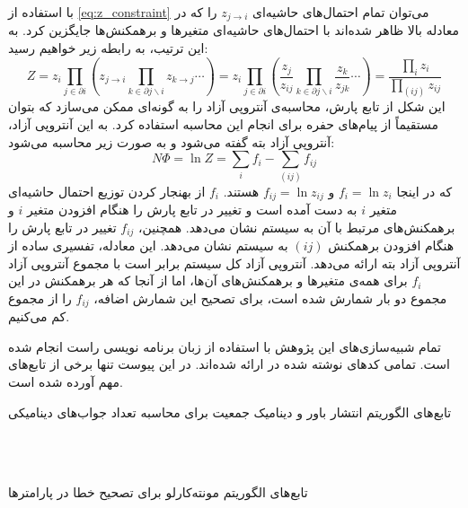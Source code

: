 \begin{appendices}
    با استفاده از
    \autoref{eq:z_constraint}
    می‌توان تمام احتمال‌های حاشیه‌ای
    \( z_{j \to i} \)
    را که در معادله بالا ظاهر شده‌اند با احتمال‌های حاشیه‌ای متغیرها و برهمکنش‌ها جایگزین کرد.
    به این ترتیب، به رابطه زیر خواهیم رسید:
    \[ Z = z_{i} \prod_{j \in \partial i} \left( z_{j \to i} \prod_{k \in \partial j \backslash i} z_{k \to j} \cdots \right) = z_{i} \prod_{j \in \partial i} \left( \frac{z_{j}}{z_{ij}} \prod_{k \in \partial j \backslash i} \frac{z_{k}}{z_{jk}} \cdots \right) = \frac{\prod_{i} z_{i}}{\prod_{(ij)} z_{ij}} \]
    این شکل از تابع پارش، محاسبه‌ی آنتروپی آزاد را به گونه‌ای ممکن می‌سازد که بتوان مستقیماً از پیام‌های حفره برای انجام این محاسبه استفاده کرد.
    به این آنتروپی آزاد، آنتروپی آزاد بته گفته می‌شود و به صورت زیر محاسبه می‌شود:
    \begin{equation}
        N \Phi = \ln Z = \sum_{i} f_{i} - \sum_{(ij)} f_{ij}
    \end{equation}
    که در اینجا
    \( f_{i} = \ln z_{i} \) و \( f_{ij} = \ln z_{ij} \)
    هستند.
    \( f_{i} \)
    از بهنجار کردن توزیع احتمال حاشیه‌ای متغیر
    \( i \)
    به دست آمده است و تغییر در تابع پارش را هنگام افزودن متغیر
    \( i \)
    و برهمکنش‌های مرتبط با آن به سیستم نشان می‌دهد.
    همچنین،
    \( f_{ij} \)
    تغییر در تابع پارش را هنگام افزودن برهمکنش
    \( (ij) \)
    به سیستم نشان می‌دهد.
    این معادله، تفسیری ساده از آنتروپی آزاد بته ارائه می‌دهد.
    آنتروپی آزاد کل سیستم برابر است با مجموع آنتروپی آزاد
    \( f_{i} \)
    برای همه‌ی متغیر‌ها و برهمکنش‌های آن‌ها، اما از آنجا که هر برهمکنش در این مجموع دو بار شمارش شده است، برای تصحیح این شمارش اضافه،
    \( f_{ij} \)
    را از مجموع کم می‌کنیم.

    تمام شبیه‌سازی‌های این پژوهش با استفاده از زبان برنامه نویسی راست انجام شده است.
    تمامی کدهای نوشته شده در
    \cite{sarikhani2024}
    ارائه شده‌اند.
    در این پیوست تنها برخی از تابع‌های مهم آورده شده است.

    \vspace{\baselineskip}
    تابع‌های الگوریتم انتشار باور و دینامیک جمعیت برای محاسبه تعداد جواب‌های دینامیکی
    \begin{latin}
        \inputminted[firstline=155,lastline=178]{rust}{../codes/bpmc/src/bin/bp.rs}
        \inputminted[firstline=206,lastline=262]{rust}{../codes/bpmc/src/bin/bp.rs}
        \inputminted[firstline=264,lastline=275]{rust}{../codes/bpmc/src/bin/bp.rs}
        \inputminted[firstline=277,lastline=298]{rust}{../codes/bpmc/src/bin/bp.rs}
    \end{latin}

    \clearpage

    تابع‌های الگوریتم مونته‌کارلو برای تصحیح خطا در پارامترها
    \begin{latin}
        \inputminted[firstline=57,lastline=83]{rust}{../codes/bpmc/src/bin/mc.rs}
        \inputminted[firstline=85,lastline=104]{rust}{../codes/bpmc/src/bin/mc.rs}
    \end{latin}
\end{appendices}
